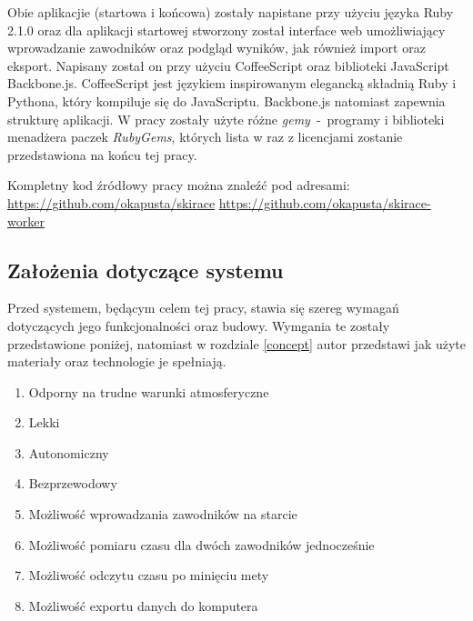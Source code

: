 \documentclass[11pt,a4paper, twoside]{article}
\begin{document}
Obie aplikacjie (startowa i końcowa) zostały napistane przy użyciu języka Ruby 2.1.0 oraz dla aplikacji startowej stworzony został interface web umożliwiający wprowadzanie zawodników oraz podgląd wyników, jak również import oraz eksport. Napisany został on przy użyciu CoffeeScript oraz biblioteki JavaScript Backbone.js. 
CoffeeScript jest językiem inspirowanym elegancką składnią Ruby i Pythona, który kompiluje się do JavaScriptu. Backbone.js natomiast zapewnia strukturę aplikacji.
\newline
\newline
\noindent
W pracy zostały użyte różne \emph{gemy}~-~programy i biblioteki menadżera paczek \emph{RubyGems}, których lista w raz z licencjami zostanie przedstawiona na końcu tej pracy.
\newline

\noindent
Kompletny kod źródłowy pracy można znaleźć pod adresami:
\newline
\url{https://github.com/okapusta/skirace}
\newline
\url{https://github.com/okapusta/skirace-worker}

\newpage

\newpage
\noindent
\subsection{Założenia dotyczące systemu}
Przed systemem, będącym celem tej pracy, stawia się szereg wymagań dotyczących jego funkcjonalności oraz budowy. Wymgania te zostały przedstawione poniżej, natomiast w rozdziale \ref{concept} autor przedstawi jak użyte materiały oraz technologie je spełniają.
\begin{enumerate}
\item Odporny na trudne warunki atmosferyczne
\item Lekki
\item Autonomiczny
\item Bezprzewodowy
\item \label{req:entry} Możliwość wprowadzania zawodników na starcie
\item \label{req:two} Możliwość pomiaru czasu dla dwóch zawodników jednocześnie
\item \label{req:lcd} Możliwość odczytu czasu po minięciu mety 
\item \label{req:export} Możliwość exportu danych do komputera
\end{enumerate}
\newpage
\end{document}

